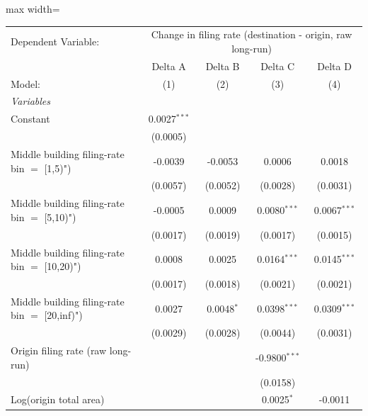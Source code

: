 \documentclass[
  11pt,
]{article}
\begin{document}
\begin{adjustbox}{max width=\textwidth}
\begingroup
\centering
\begin{tabular}{lcccc}
   \tabularnewline \midrule \midrule
   Dependent Variable: & \multicolumn{4}{c}{Change in filing rate (destination - origin, raw long-run)}\\
                                                  & Delta A        & Delta B      & Delta C         & Delta D \\   
   Model:                                         & (1)            & (2)          & (3)             & (4)\\  
   \midrule
   \emph{Variables}\\
   Constant                                       & 0.0027$^{***}$ &              &                 &   \\   
                                                  & (0.0005)       &              &                 &   \\   
   Middle building filing-rate bin $=$ [1,5)")    & -0.0039        & -0.0053      & 0.0006          & 0.0018\\   
                                                  & (0.0057)       & (0.0052)     & (0.0028)        & (0.0031)\\   
   Middle building filing-rate bin $=$ [5,10)")   & -0.0005        & 0.0009       & 0.0080$^{***}$  & 0.0067$^{***}$\\   
                                                  & (0.0017)       & (0.0019)     & (0.0017)        & (0.0015)\\   
   Middle building filing-rate bin $=$ [10,20)")  & 0.0008         & 0.0025       & 0.0164$^{***}$  & 0.0145$^{***}$\\   
                                                  & (0.0017)       & (0.0018)     & (0.0021)        & (0.0021)\\   
   Middle building filing-rate bin $=$ [20,inf)") & 0.0027         & 0.0048$^{*}$ & 0.0398$^{***}$  & 0.0309$^{***}$\\   
                                                  & (0.0029)       & (0.0028)     & (0.0044)        & (0.0031)\\   
   Origin filing rate (raw long-run)              &                &              & -0.9800$^{***}$ &   \\   
                                                  &                &              & (0.0158)        &   \\   
   Log(origin total area)                         &                &              & 0.0025$^{*}$    & -0.0011\\   

\end{tabular}
\end{adjustbox}
\end{document}
